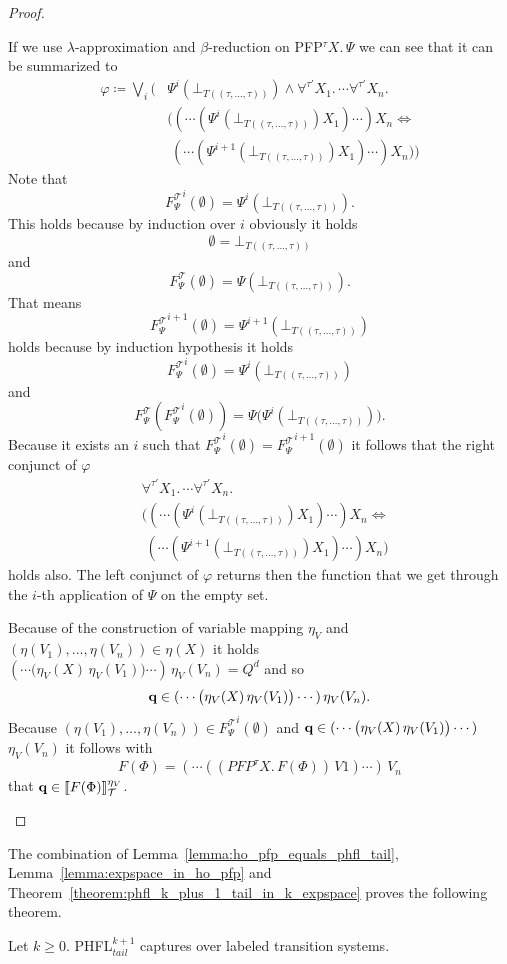 \begin{proof}
\begin{compactitem}
         If we use $\lambda$-approximation and $\beta$-reduction on PFP$^\tau X.\,\Psi$ we can 
         see that it can be summarized to
         \begin{align*}
         \varphi \coloneqq \underset{i}{\bigvee} \Big(&\Psi^i(\bot_{T((\tau, \dots, \tau))}) \wedge \forall^{\tau'} X_1.\, \dotsb \forall^{\tau'} X_n.\,\\& 
         \big((\dotsb(\Psi^i(\bot_{T((\tau, \dots, \tau))}) X_1)\dotsb)X_n \Leftrightarrow \\&\;(\dotsb(\Psi^{i+1}(\bot_{T((\tau, \dots, \tau))}) X_1)\dotsb)X_n\big)\Big)
         \end{align*}
		Note that 
		\[{F_\Psi^\mathcal{T}}^i(\emptyset) = \Psi^i(\bot_{T((\tau, \dots, \tau))}).\] 
		This holds because by induction over $i$ obviously it holds
		\[\emptyset = \bot_{T((\tau, \dots, \tau))}\] 
		and 
		\[F_\Psi^\mathcal{T}(\emptyset) = \Psi(\bot_{T((\tau, \dots, \tau))}).\] 
		That means 
		\[{F_\Psi^\mathcal{T}}^{i+1}(\emptyset) = \Psi^{i+1}(\bot_{T((\tau, \dots, \tau))})\] 
		holds because by induction hypothesis it holds 
		\[{F_\Psi^\mathcal{T}}^{i}
		(\emptyset) = \Psi^{i}(\bot_{T((\tau, \dots, \tau))})\] 
		and 
		\[F_\Psi^\mathcal{T}({F_\Psi^\mathcal{T}}^{i}(\emptyset))= \Psi\big(\Psi^{i}(\bot_{T((\tau, \dots, \tau))})\big).\]
		Because it exists an $i$ such that ${F_\Psi^\mathcal{T}}^i(\emptyset) = {F_\Psi^		
        \mathcal{T}}^{i+1}(\emptyset)$ it follows that the right conjunct of $\varphi$
		\begin{align*}
		&\forall^{\tau'} X_1.\, \dotsb \forall^{\tau'} X_n.\,\\& 
         \big((\dotsb(\Psi^i(\bot_{T((\tau, \dots, \tau))}) X_1)\dotsb)X_n \Leftrightarrow \\&\;(\dotsb(\Psi^{i+1}(\bot_{T((\tau, \dots, \tau))}) X_1)\dotsb)X_n\big)
         \end{align*}
		holds also. The left conjunct of $\varphi$ returns then the function that we get through  
		the $i$-th application of $\Psi$ on the empty set.
		
		Because of the construction of variable mapping $\eta_V$ and $(\eta(V_1), \dots, \eta(V_n)) 
		\in \eta(X)$ it holds $(\dotsb\big(\eta_V(X)\,\eta_V(V_1)\big) \dotsb )\,\eta_V(V_n) = Q^d$
        and so 
         \[\emph{q} \in (\dotsb\big(\eta_V(X)\,\eta_V(V_1)\big) \dotsb )\,\eta_V(V_n).\]
         Because $(\eta(V_1), \dots, \eta(V_n)) \in {F_\Psi^\mathcal{T}}^i(\emptyset)$ and $
         \emph{q} \in (\dotsb\big(\eta_V(X)\,\eta_V(V_1)\big) \dotsb )\,$ $\eta_V(V_n)$ it follows with 
        \[F(\Phi) = (\dotsb((PFP^\tau X.\, F(\Phi))\, V1)\dotsb )\, V_n \]
        that $\emph{q} \in \llbracket F(\Phi) \rrbracket_\mathcal{T}^{\eta_V}$.
    \end{compactitem}
\end{proof}

The combination of Lemma~\ref{lemma:ho_pfp_equals_phfl_tail}, Lemma~\ref{lemma:expspace_in_ho_pfp} and
Theorem~\ref{theorem:phfl_k_plus_1_tail_in_k_expspace} proves the following theorem.

\begin{theorem}
    Let $k \geq 0$. PHFL$^{k+1}_{tail}$ captures  over labeled transition systems.
\end{theorem}